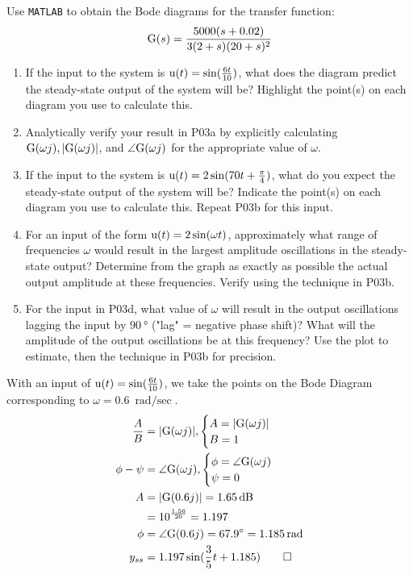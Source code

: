 \begin{hwkProblem}{3}{}

	Use \lstinline{MATLAB} to obtain the Bode diagrams for the transfer function:
	\[
		\func{G}[s]=\frac{5000(s+0.02)}{3(2+s)(20+s)^{2}}
	\]
	\begin{enumerate}
		\item If the input to the system is \(\func{u}[t]=\sin(\frac{6 t}{10})\), what does the diagram predict the steady-state output of the system will be? Highlight the point(s) on each diagram you use to calculate this.
		\item Analytically verify your result in P03a by explicitly calculating \(\func{G}[\omega j],|\func{G}[\omega j]|\), and \(\angle \func{G}[\omega j]\) for the appropriate value of \(\omega\).
		\item If the input to the system is \(\func{u}[t]=2 \sin(70 t+\frac{\pi}{4})\), what do you expect the steady-state output of the system will be? Indicate the point(s) on each diagram you use to calculate this. Repeat P03b for this input.
		\item For an input of the form \(\func{u}[t]=2 \sin(\omega t)\), approximately what range of frequencies \(\omega\) would result in the largest amplitude oscillations in the steady-state output? Determine from the graph as exactly as possible the actual output amplitude at these frequencies. Verify using the technique in P03b.
		\item For the input in P03d, what value of \(\omega\) will result in the output oscillations lagging the input by \( \qty{90}{\degree} \) ("lag" = negative phase shift)? What will the amplitude of the output oscillations be at this frequency? Use the plot to estimate, then the technique in P03b for precision.
	\end{enumerate}

	\hwkSol{}

	\hwkPart{}

	With an input of \( \func{u}[t] = \sin(\frac{6 t}{10}) \), we take the points on the Bode Diagram corresponding to \( \omega = \qty{0.6}{\radian\per\sec} \).
	\begin{align*}
		\frac{A}{B} &= |\func{G}[\omega j]|,
		\begin{cases}
			A = |\func{G}[\omega j]| \\
			B = 1 \\
		\end{cases} \\
		\phi - \psi &= \angle \func{G}[\omega j],
		\begin{cases}
			\phi = \angle \func{G}[\omega j] \\
			\psi = 0 \\
		\end{cases} \\
		A &= |\func{G}[0.6j]| = \qty{1.65}{\decibel} \\
		  &= 10^{\frac{1.56}{20}} = 1.197 \\
		\phi &= \angle \func{G}[0.6j] = \qty{67.9}{\degree} = \qty{1.185}{\radian} \\
		y_{ss} &= 1.197 \sin(\frac{3}{5}t+1.185) \qed
	\end{align*}


\end{hwkProblem}
